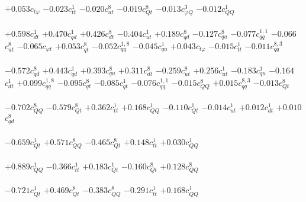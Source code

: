 \documentclass{article}
\begin{document}
{$+0.053$}{\rm $c_{t \varphi}$} 
{$-0.023$}{\rm $c_{tt}^{1}$} 
{$-0.020$}{\rm $c_{ut}^{8}$} 
{$-0.019$}{\rm $c_{Qt}^{8}$} 
{$-0.013$}{\rm $c_{\varphi Q}^{3}$} 
{$-0.012$}{\rm $c_{QQ}^{1}$} 
 \nonumber \\ \nonumber \\ 
{$+0.598$}{\rm $c_{dt}^{1}$} 
{$+0.470$}{\rm $c_{qd}^{1}$} 
{$+0.426$}{\rm $c_{dt}^{8}$} 
{$-0.404$}{\rm $c_{ut}^{1}$} 
{$+0.189$}{\rm $c_{qd}^{8}$} 
{$-0.127$}{\rm $c_{qu}^{8}$} 
{$-0.077$}{\rm $c_{qq}^{1,1}$} 
{$-0.066$}{\rm $c_{ut}^{8}$} 
{$-0.065$}{\rm $c_{\varphi t}$} 
{$+0.053$}{\rm $c_{qt}^{8}$} 
{$-0.052$}{\rm $c_{qq}^{1,8}$} 
{$-0.045$}{\rm $c_{qu}^{1}$} 
{$+0.043$}{\rm $c_{t \varphi}$} 
{$-0.015$}{\rm $c_{tt}^{1}$} 
{$-0.011$}{\rm $c_{qq}^{8,3}$} 
 \nonumber \\ \nonumber \\ 
{$-0.572$}{\rm $c_{qd}^{8}$} 
{$+0.443$}{\rm $c_{qd}^{1}$} 
{$+0.393$}{\rm $c_{qu}^{8}$} 
{$+0.311$}{\rm $c_{dt}^{8}$} 
{$-0.259$}{\rm $c_{ut}^{8}$} 
{$+0.256$}{\rm $c_{ut}^{1}$} 
{$-0.183$}{\rm $c_{qu}^{1}$} 
{$-0.164$}{\rm $c_{dt}^{1}$} 
{$+0.099$}{\rm $c_{qq}^{1,8}$} 
{$-0.095$}{\rm $c_{qt}^{8}$} 
{$-0.085$}{\rm $c_{qt}^{1}$} 
{$-0.076$}{\rm $c_{qq}^{1,1}$} 
{$-0.015$}{\rm $c_{QQ}^{8}$} 
{$+0.015$}{\rm $c_{qq}^{8,3}$} 
{$-0.013$}{\rm $c_{Qt}^{8}$} 
 \nonumber \\ \nonumber \\ 
{$-0.702$}{\rm $c_{QQ}^{8}$} 
{$-0.579$}{\rm $c_{Qt}^{8}$} 
{$+0.362$}{\rm $c_{tt}^{1}$} 
{$+0.168$}{\rm $c_{QQ}^{1}$} 
{$-0.110$}{\rm $c_{Qt}^{1}$} 
{$-0.014$}{\rm $c_{ut}^{1}$} 
{$+0.012$}{\rm $c_{dt}^{1}$} 
{$+0.010$}{\rm $c_{qd}^{8}$} 
 \nonumber \\ \nonumber \\ 
{$-0.659$}{\rm $c_{Qt}^{1}$} 
{$+0.571$}{\rm $c_{QQ}^{8}$} 
{$-0.465$}{\rm $c_{Qt}^{8}$} 
{$+0.148$}{\rm $c_{tt}^{1}$} 
{$+0.030$}{\rm $c_{QQ}^{1}$} 
 \nonumber \\ \nonumber \\ 
{$+0.889$}{\rm $c_{QQ}^{1}$} 
{$-0.366$}{\rm $c_{tt}^{1}$} 
{$+0.183$}{\rm $c_{Qt}^{1}$} 
{$-0.160$}{\rm $c_{Qt}^{8}$} 
{$+0.128$}{\rm $c_{QQ}^{8}$} 
 \nonumber \\ \nonumber \\ 
{$-0.721$}{\rm $c_{Qt}^{1}$} 
{$+0.469$}{\rm $c_{Qt}^{8}$} 
{$-0.383$}{\rm $c_{QQ}^{8}$} 
{$-0.291$}{\rm $c_{tt}^{1}$} 
{$+0.168$}{\rm $c_{QQ}^{1}$} 
 \nonumber \\ \nonumber \\ 
\end{document}
